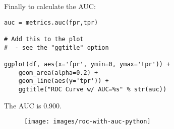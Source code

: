 \documentclass[SKL-MASTER.tex]{subfiles}
\begin{document}
\newpage
Finally to calculate the AUC:
{
	\large
\begin{framed}
	\begin{verbatim}
auc = metrics.auc(fpr,tpr)

# Add this to the plot
#  - see the "ggtitle" option

ggplot(df, aes(x='fpr', ymin=0, ymax='tpr')) +
    geom_area(alpha=0.2) +
    geom_line(aes(y='tpr')) +
    ggtitle("ROC Curve w/ AUC=%s" % str(auc))
 \end{verbatim}
\end{framed}
}
The AUC is 0.900. 
\begin{figure}[h!]
\centering
\texttt{[image: images/roc-with-auc-python]}

\end{figure}

\end{document}
